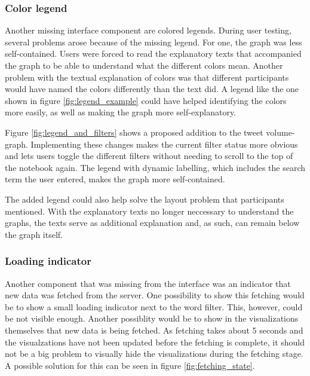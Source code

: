\subsubsection*{Color legend}
Another missing interface component are colored legends. During user testing, several problems arose because of the missing legend. For one, the graph was less self-contained. Users were forced to read the explanatory texts that accompanied the graph to be able to understand what the different colors mean. Another problem with the textual explanation of colors was that different participants would have named the colors differently than the text did. A legend like the one shown in figure \ref{fig:legend_example} could have helped identifying the colors more easily, as well as making the graph more self-explanatory.

Figure \ref{fig:legend_and_filters} shows a proposed addition to the tweet volume-graph. Implementing these changes makes the current filter status more obvious and lets users toggle the different filters without needing to scroll to the top of the notebook again. The legend with dynamic labelling, which includes the search term the user entered, makes the graph more self-contained.

The added legend could also help solve the layout problem that participants mentioned. With the explanatory texts no longer neccessary to understand the graphs, the texts serve as additional explanation and, as such, can remain below the graph itself.

\subsubsection*{Loading indicator}
Another component that was missing from the interface was an indicator that new data was fetched from the server. One possibility to show this fetching would be to show a small loading indicator next to the word filter. This, however, could be not visible enough. Another possiblity would be to show in the visualizations themselves that new data is being fetched. As fetching takes about 5 seconds and the visualzations have not been updated before the fetching is complete, it should not be a big problem to visually hide the visualizations during the fetching stage. A possible solution for this can be seen in figure \ref{fig:fetching_state}.

